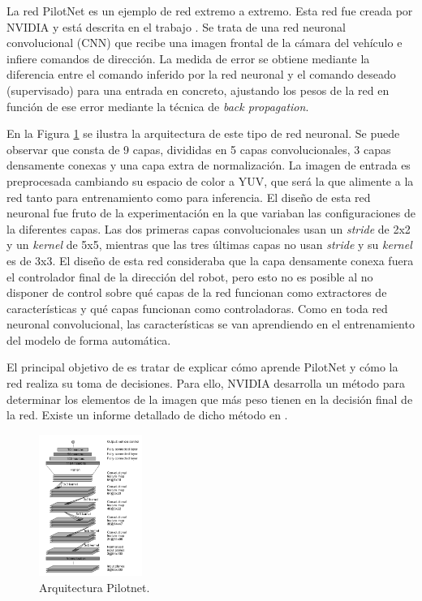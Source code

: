 La red PilotNet \cite{end2end} \cite{explaining-end2end} es un ejemplo de red extremo a extremo. Esta red fue creada por NVIDIA y está descrita en el trabajo \cite{end2end}. Se trata de una red neuronal convolucional (CNN) que recibe una imagen frontal de la cámara del vehículo e infiere comandos de dirección. La medida de error se obtiene mediante la diferencia entre el comando inferido por la red neuronal y el comando deseado (supervisado) para una entrada en concreto, ajustando los pesos de la red en función de ese error mediante la técnica de \textit{back propagation}.

En la Figura \ref{fig.pilotnet} se ilustra la arquitectura de este tipo de red neuronal. Se puede observar que consta de 9 capas, divididas en 5 capas convolucionales, 3 capas densamente conexas y una capa extra de normalización. La imagen de entrada es preprocesada cambiando su espacio de color a YUV, que será la que alimente a la red tanto para entrenamiento como para inferencia. El diseño de esta red neuronal fue fruto de la experimentación en la que variaban las configuraciones de la diferentes capas. Las dos primeras capas convolucionales usan un \textit{stride} de 2x2 y un \textit{kernel} de 5x5, mientras que las tres últimas capas no usan \textit{stride} y su \textit{kernel} es de 3x3. El diseño de esta red consideraba que la capa densamente conexa fuera el controlador final de la dirección del robot, pero esto no es posible al no disponer de control sobre qué capas de la red funcionan como extractores de características y qué capas funcionan como controladoras. Como en toda red neuronal convolucional, las características se van aprendiendo en el entrenamiento del modelo de forma automática.

El principal objetivo de \cite{explaining-end2end} es tratar de explicar cómo aprende PilotNet y cómo la red realiza su toma de decisiones. Para ello, NVIDIA desarrolla un método para determinar los elementos de la imagen que más peso tienen en la decisión final de la red. Existe un informe detallado de dicho método en \cite{visual}.

\begin{figure}
\begin{center}
	\includegraphics[width=0.3\textwidth]{img/pilotnet.png}
   \caption{Arquitectura Pilotnet.}
	\label{fig.pilotnet}
\end{center}
\end{figure}

